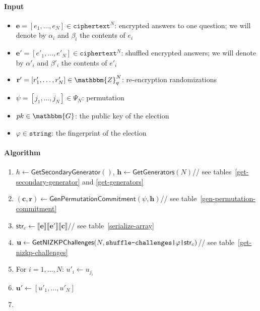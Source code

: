 \documentclass[a4paper]{article}
\newcommand{\G}{\mathbbm{G}}
\newcommand{\Z}{\mathbbm{Z}}
\newcommand{\jstring}{\texttt{string}}
\begin{document}
\begin{table}
  \small
  \begin{framed}
    \noindent\paragraph{Input}
    \begin{itemize}
    \item $\textbf{e}=[e_1,\dots,e_N]\in\texttt{ciphertext}^N$:
      encrypted answers to one question; we will denote by
      $\alpha_i$ and $\beta_i$ the contents of $e_i$
    \item $\textbf{e}'=[e'_1,\dots,e'_N]\in\texttt{ciphertext}^N$:
      shuffled encrypted answers; we will denote by
      $\alpha'_i$ and $\beta'_i$ the contents of $e'_i$
    \item $\textbf{r}'=[r'_1,\dots,r'_N]\in\Z_q^N$: re-encryption
      randomizations
    \item $\psi=[j_1,\dots,j_N]\in\Psi_N$: permutation
    \item $pk\in\G$: the public key of the election
    \item $\varphi\in\jstring$: the fingerprint of the election
    \end{itemize}
    \noindent\paragraph{Algorithm}
    \begin{enumerate}
    \item $h\leftarrow\textsf{GetSecondaryGenerator}()$,
      $\textbf{h}\leftarrow\textsf{GetGenerators}(N)$\hfill// see
      tables~\ref{get-secondary-generator} and \ref{get-generators}
    \item
      $(\textbf{c},\textbf{r})\leftarrow\textsf{GenPermutationCommitment}(\psi,\textbf{h})$\hfill//
      see table~\ref{gen-permutation-commitment}
    \item
      $\textsf{str}_c\leftarrow\llbracket\textbf{e}\rrbracket\llbracket\textbf{e}'\rrbracket\llbracket\textbf{c}\rrbracket$\hfill//
      see table~\ref{serialize-array}
    \item
      $\textbf{u}\leftarrow\textsf{GetNIZKPChallenges}(N,\verb=shuffle-challenges|=\varphi\verb=|=\textsf{str}_c)$\hfill//
      see table~\ref{get-nizkp-challenges}
    \item For $i=1,\dots,N$: $u'_i\leftarrow u_{j_i}$
    \item $\textbf{u}'\leftarrow[u'_1,\dots,u'_N]$
    \item

\end{enumerate}
\end{framed}
\end{table}
\end{document}
